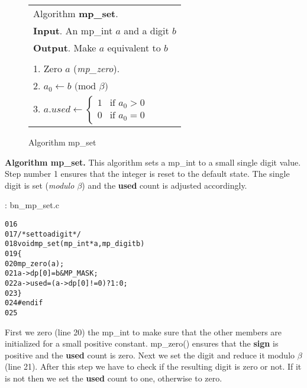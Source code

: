\documentclass[b5paper]{book}
\begin{document}
\newpage\begin{figure}[here]
\begin{center}
\begin{tabular}{l}
\hline Algorithm \textbf{mp\_set}. \\
\textbf{Input}.   An mp\_int $a$ and a digit $b$ \\
\textbf{Output}.  Make $a$ equivalent to $b$ \\
\hline \\
1.  Zero $a$ (\textit{mp\_zero}). \\
2.  $a_0 \leftarrow b \mbox{ (mod }\beta\mbox{)}$ \\
3.  $a.used \leftarrow  \left \lbrace \begin{array}{ll}
                              1 &  \mbox{if }a_0 > 0 \\
                              0 &  \mbox{if }a_0 = 0 
                              \end{array} \right .$ \\
\hline                              
\end{tabular}
\end{center}
\caption{Algorithm mp\_set}
\end{figure}

\textbf{Algorithm mp\_set.}
This algorithm sets a mp\_int to a small single digit value.  Step number 1 ensures that the integer is reset to the default state.  The
single digit is set (\textit{modulo $\beta$}) and the \textbf{used} count is adjusted accordingly.

\vspace{+3mm}\begin{small}
\hspace{-5.1mm}{\bf File}: bn\_mp\_set.c
\vspace{-3mm}
\begin{alltt}
016   
017   /* set to a digit */
018   void mp_set (mp_int * a, mp_digit b)
019   \{
020     mp_zero (a);
021     a->dp[0] = b & MP_MASK;
022     a->used  = (a->dp[0] != 0) ? 1 : 0;
023   \}
024   #endif
025   
\end{alltt}
\end{small}

First we zero (line 20) the mp\_int to make sure that the other members are initialized for a 
small positive constant.  mp\_zero() ensures that the \textbf{sign} is positive and the \textbf{used} count
is zero.  Next we set the digit and reduce it modulo $\beta$ (line 21).  After this step we have to 
check if the resulting digit is zero or not.  If it is not then we set the \textbf{used} count to one, otherwise
to zero.
\end{document}
